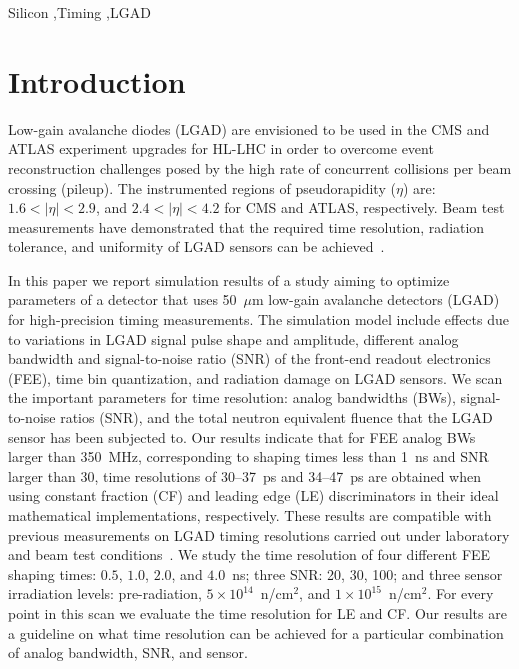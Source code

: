 \documentclass[preprint,1p]{elsarticle}
\begin{document}
\begin{frontmatter}
\begin{keyword}

Silicon \sep Timing \sep LGAD

\end{keyword}

\end{frontmatter}

\tableofcontents


\section{Introduction}

Low-gain avalanche diodes (LGAD) are envisioned to be used in the CMS and ATLAS experiment 
upgrades for HL-LHC in order to overcome event reconstruction challenges posed by the high rate of concurrent
collisions per beam crossing (pileup). The instrumented regions of pseudorapidity ($\eta$)
are: $1.6< |\eta| <2.9$, and $2.4< |\eta|<4.2$ for CMS and ATLAS, respectively.
Beam test measurements have demonstrated that the required time resolution,
radiation tolerance, and uniformity of LGAD sensors can be achieved~\cite{Apresyan:2018oln,Allaire_2018}.

In this paper we report simulation results of a study aiming to optimize 
parameters of a detector that uses 50~$\mu$m low-gain avalanche detectors (LGAD) for
high-precision timing measurements. The simulation model include effects due to variations 
in LGAD signal pulse shape and amplitude, different analog bandwidth and signal-to-noise ratio (SNR) of the front-end readout 
electronics (FEE), time bin quantization, and radiation damage on LGAD sensors.
We scan the important parameters for time resolution: analog bandwidths (BWs),
signal-to-noise ratios (SNR), and the total neutron equivalent fluence that the 
LGAD sensor has been subjected to. Our results indicate that for FEE analog BWs larger than 350~\si{MHz},
corresponding to shaping times less than 1~\si{ns} and SNR larger than 30, time resolutions of 30--37~\si{ps} and 34--47~\si{ps}
are obtained when using constant fraction (CF) and leading edge (LE) discriminators in their ideal mathematical implementations, respectively.
These results are compatible with previous measurements on LGAD timing resolutions carried out under
laboratory and beam test conditions~\cite{Apresyan:2018oln, Cartiglia201783, PELLEGRINI201412}.
We study the time resolution of four different FEE shaping times: $0.5$, $1.0$,
$2.0$, and $4.0$~\si{ns}; three SNR: 20, 30, 100; and three sensor irradiation
levels: pre-radiation, $5\times 10^{14}$~n/cm$^2$, and $1\times 10^{15}$~n/cm$^2$.
For every point in this scan we evaluate the time resolution for LE and CF.
Our results are a guideline on what time resolution can
be achieved for a particular combination of analog bandwidth, SNR, and sensor.
\end{document}
